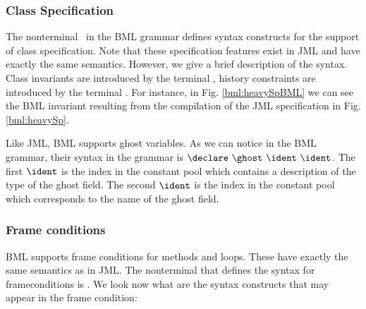 \subsubsection{Class Specification}
 The nonterminal  \ClassSpec \ in the BML grammar defines syntax constructs for the
 support of class specification. Note that these specification features exist in JML
 and have exactly the same semantics. 
 However, we give a brief description of the syntax. 
 Class invariants are introduced by the terminal
 \ClassInv, history constraints are introduced by the terminal \ClassHistoryConstr. 
 For instance, in Fig. \ref{bml:heavySpBML} we can see the BML invariant resulting from the
 compilation of the JML specification in Fig. \ref{bml:heavySp}. 

 Like JML, BML supports ghost variables. 
 As we can notice in the BML grammar, their syntax in the grammar is 
 $\declare \ \ghost \ \ident  \ \ident$. The first $\ident$ is the index in the constant pool which contains a description 
of the type of the ghost field. The second $\ident$ is the index in the constant pool which corresponds to the name of the ghost field.
 

 
\subsubsection{Frame conditions} 
BML supports frame conditions for methods and loops. These have exactly the same semantics as in JML. 
The nonterminal that defines the syntax for frameconditions is  \modifiesLoc.
We look now what are the syntax constructs that may appear in the frame condition:

